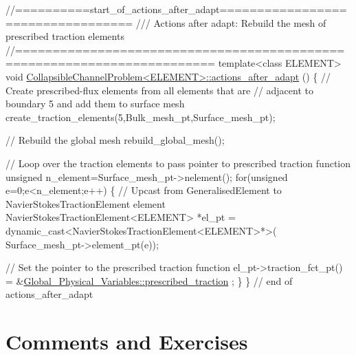 \begin{DoxyCodeInclude}
\textcolor{comment}{//==========start\_of\_actions\_after\_adapt==================================}
\textcolor{comment}{/// Actions after adapt: Rebuild the mesh of prescribed traction elements}
\textcolor{comment}{}\textcolor{comment}{//========================================================================}
\textcolor{keyword}{template}<\textcolor{keyword}{class} ELEMENT>
\textcolor{keywordtype}{void} \hyperlink{classCollapsibleChannelProblem_a3ea01d83f0256c588a652741c6c33e0e}{CollapsibleChannelProblem<ELEMENT>::actions\_after\_adapt}
      ()
\{
 \textcolor{comment}{// Create prescribed-flux elements from all elements that are }
 \textcolor{comment}{// adjacent to boundary 5 and add them to surface mesh}
 create\_traction\_elements(5,Bulk\_mesh\_pt,Surface\_mesh\_pt);

 \textcolor{comment}{// Rebuild the global mesh}
 rebuild\_global\_mesh();
 
 \textcolor{comment}{// Loop over the traction elements to pass pointer to prescribed traction function}
 \textcolor{keywordtype}{unsigned} n\_element=Surface\_mesh\_pt->nelement();
 \textcolor{keywordflow}{for}(\textcolor{keywordtype}{unsigned} e=0;e<n\_element;e++)
  \{
   \textcolor{comment}{// Upcast from GeneralisedElement to NavierStokesTractionElement element}
   NavierStokesTractionElement<ELEMENT> *el\_pt = 
    \textcolor{keyword}{dynamic\_cast<}NavierStokesTractionElement<ELEMENT>*\textcolor{keyword}{>}(
     Surface\_mesh\_pt->element\_pt(e));
   
   \textcolor{comment}{// Set the pointer to the prescribed traction function}
   el\_pt->traction\_fct\_pt() = &\hyperlink{namespaceGlobal__Physical__Variables_a0de42ee6d39e85c77c16a04c3a05f7a2}{Global\_Physical\_Variables::prescribed\_traction}
      ;
  \}
\} \textcolor{comment}{// end of actions\_after\_adapt}

\end{DoxyCodeInclude}




 

\hypertarget{index_comments}{}\section{Comments and Exercises}\label{index_comments}

